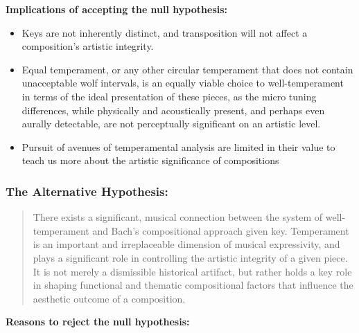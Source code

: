 \textbf{Implications of accepting the null hypothesis:}

\begin{itemize}
\tightlist
\item
  Keys are not inherently distinct, and transposition will not affect a
  composition's artistic integrity.
\item
  Equal temperament, or any other circular temperament that does not
  contain unacceptable wolf intervals, is an equally viable choice to
  well-temperament in terms of the ideal presentation of these pieces,
  as the micro tuning differences, while physically and acoustically
  present, and perhaps even aurally detectable, are not perceptually
  significant on an artistic level.
\item
  Pursuit of avenues of temperamental analysis are limited in their
  value to teach us more about the artistic significance of compositions
\end{itemize}

\subsubsection{The Alternative
Hypothesis:}\label{the-alternative-hypothesis}

\begin{quote}
There exists a significant, musical connection between the system of
well-temperament and Bach's compositional approach given key.
Temperament is an important and irreplaceable dimension of musical
expressivity, and plays a significant role in controlling the artistic
integrity of a given piece. It is not merely a dismissible historical
artifact, but rather holds a key role in shaping functional and thematic
compositional factors that influence the aesthetic outcome of a
composition.
\end{quote}

\textbf{Reasons to reject the null hypothesis:}

